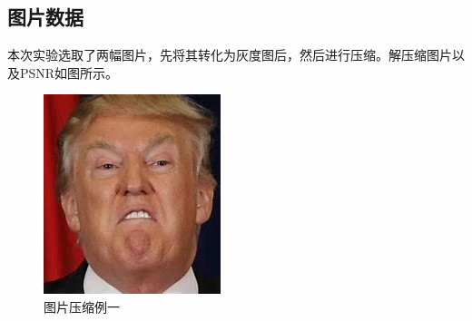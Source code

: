 \documentclass[withoutpreface,bwprint]{cumcmthesis}
\begin{document}
\subsection{图片数据}
本次实验选取了两幅图片，先将其转化为灰度图后，然后进行压缩。解压缩图片以及PSNR如图所示。
\begin{figure}[H]
    \centering
    \includegraphics[width=\textwidth]{trump}
    \caption{图片压缩例一}
    \label{图4}
\end{figure}
\end{document}
